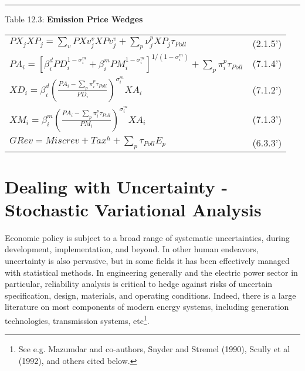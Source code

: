 \documentclass[12pt]{article}
\begin{document}
\noindent\rule{\linewidth}{0.4pt}
\begin{center}
\begin{large}
{\centering Table 12.3: \textbf{Emission Price Wedges} \par}

\begin{tabular}{>{\raggedright}p{} l}


$PX_jXP_j = \displaystyle \sum_v PXv^v_j XPv^v_j + \sum_p \nu^p_j XP_j \tau_{Poll}$ & (2.1.5') \\[15pt]

{\small$PA_i = \left[\beta^d_i PD^{1-{\sigma^m_i}}_i + \beta^m_i PM^{1 - {\sigma^m_i}}_i \right]^{1/(1-{\sigma^m_i})} + \displaystyle \sum_p \pi^p_i \tau_{Poll}$} & (7.1.4') \\[15pt]

$XD_i = \beta^d_i \left(\frac{PA_i - \displaystyle \sum_p \pi^p_i \tau_{Poll}}{PD_i} \right)^{\sigma^m_i} XA_i$ & (7.1.2') \\[15pt]

$XM_i = \beta^m_i \left(\frac{PA_i - \displaystyle \sum_p \pi^p_i \tau_{Poll}}{PM_i} \right)^{\sigma^m_i} XA_i$ & (7.1.3') \\[15pt]

$GRev = Miscrev + Tax^h + \displaystyle \sum_p \tau_{Poll} E_p$ & (6.3.3') \\[20pt]

\hline
\end{tabular}
\end{large}
\end{center}

\newpage

\section{Dealing with Uncertainty - Stochastic Variational Analysis}

Economic policy is subject to a broad range of systematic uncertainties, during development, implementation, and beyond. In other human endeavors, uncertainty is also pervasive, but in some fields it has been effectively managed with statistical methods. In engineering generally and the electric power sector in particular, reliability analysis is critical to hedge against risks of uncertain specification, design, materials, and operating conditions. Indeed, there is a large literature on most components of modern energy systems, including generation technologies, transmission systems, etc\footnote{ See e.g. Mazumdar and co-authors, Snyder and Stremel (1990), Scully et al (1992), and others cited below.}.
\end{document}
